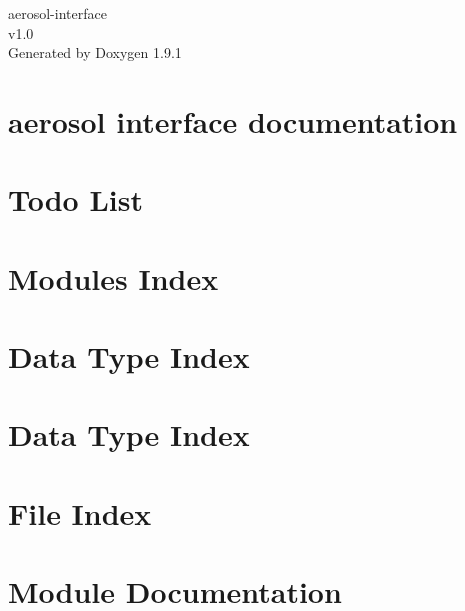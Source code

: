 \let\mypdfximage\pdfximage\def\pdfximage{\immediate\mypdfximage}\documentclass[twoside]{book}
\newcommand{\+}{\discretionary{\mbox{\scriptsize$\hookleftarrow$}}{}{}}
\newcommand{\clearemptydoublepage}{%
  \newpage{\pagestyle{empty}\cleardoublepage}%
}
\begin{document}
\raggedbottom

\hypersetup{pageanchor=false,
             bookmarksnumbered=true,
             pdfencoding=unicode
            }
\begin{titlepage}
\vspace*{7cm}
\begin{center}%
{\Large aerosol-\/interface \\[1ex]\large v1.\+0 }\\
\vspace*{1cm}
{\large Generated by Doxygen 1.9.1}\\
\end{center}
\end{titlepage}
\clearemptydoublepage
{}
\tableofcontents
\clearemptydoublepage
{}
\hypersetup{pageanchor=true}

\chapter{aerosol interface documentation}
\label{index}\hypertarget{index}{}
\chapter{Todo List}
\label{todo}

\chapter{Modules Index}

\chapter{Data Type Index}

\chapter{Data Type Index}

\chapter{File Index}

\chapter{Module Documentation}











\end{document}
